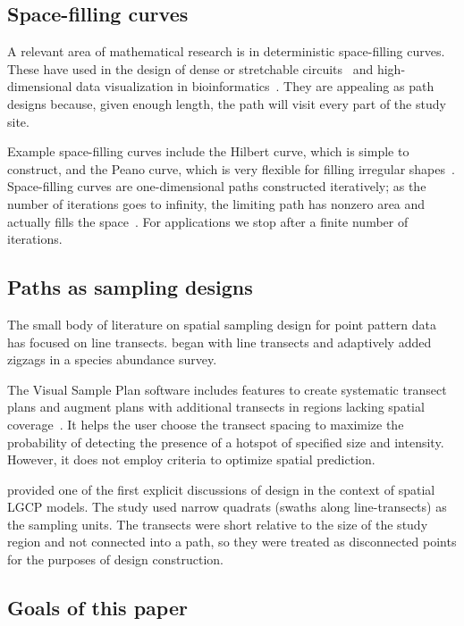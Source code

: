 \documentclass[review]{elsarticle}
\begin{document}
\subsection{Space-filling curves}

A relevant area of mathematical research is in deterministic space-filling
curves. These have used in the design of dense or stretchable
circuits~\citep{ogorzalek,mazhang} and high-dimensional data visualization
in bioinformatics~\citep{hilbertvis}. They are appealing as path designs
because, given enough length, the path will visit every part of the study site.

Example space-filling curves include the Hilbert curve, which is simple to
construct, and the Peano curve, which is very flexible for filling irregular
shapes~\citep{fanetal}. Space-filling curves are one-dimensional paths
constructed iteratively; as the number of iterations goes to infinity, the
limiting path has nonzero area and actually fills the space~\citep{sagan}. For
applications we stop after a finite number of iterations.


\subsection{Paths as sampling designs}

The small body of literature on spatial sampling design for point pattern
data has focused on line transects. \citet{pollard} began with line transects
and adaptively added zigzags in a species abundance survey.

The Visual Sample Plan software includes features to create systematic transect
plans and augment plans with additional transects in regions lacking spatial
coverage~\citep{vspguide}. It helps the user choose the transect spacing to
maximize the probability of detecting the presence of a hotspot of specified
size and intensity. However, it does not employ criteria to optimize spatial
prediction.

\citet{liuvanhatalo} provided one of the first explicit discussions of design
in the context of spatial LGCP models. The study used narrow quadrats (swaths
along line-transects) as the sampling units. The transects were short relative
to the size of the study region and not connected into a path, so they were
treated as disconnected points for the purposes of design construction.


\subsection{Goals of this paper}
\end{document}
